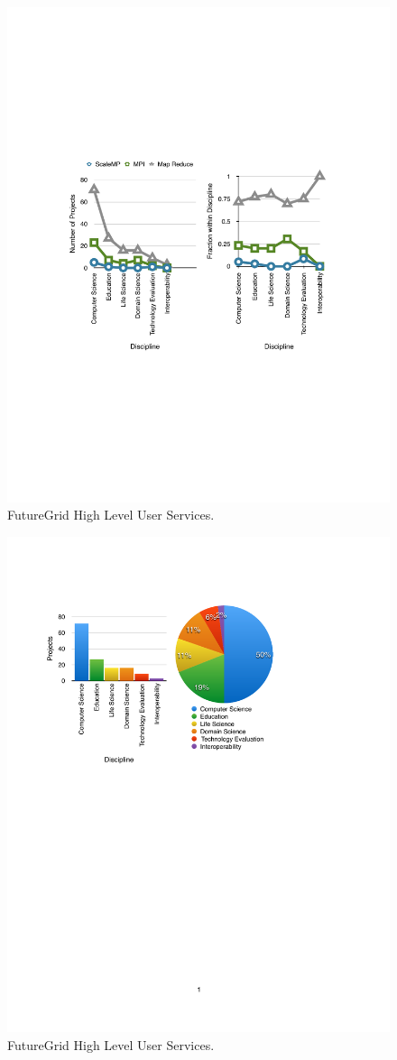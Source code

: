 \begin{figure}[htb]
  \centering
    \includegraphics[width=1.0\textwidth]{images/project-frequency-1.pdf}
  \caption{FutureGrid High Level User Services.}
\end{figure}

\begin{figure}[htb]
  \centering
    \includegraphics[width=1.0\textwidth]{images/project-disciplines.pdf}
  \caption{FutureGrid High Level User Services.}
\end{figure}

